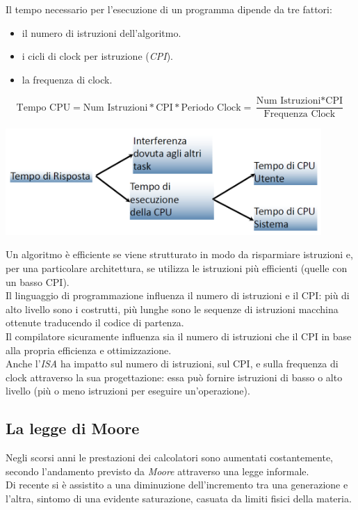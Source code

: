 Il tempo necessario per l'esecuzione di un programma dipende da tre fattori:
\begin{itemize}[nolistsep]
	\item il numero di istruzioni dell'algoritmo.
	\item i cicli di clock per istruzione (\textit{CPI}).
	\item la frequenza di clock.
\end{itemize}
\begin{equation*}
\text{Tempo CPU} = \text{Num Istruzioni} * \text{CPI} * \text{Periodo Clock} = \frac{\text{Num Istruzioni} * \text{CPI}}{\text{Frequenza Clock}}
\end{equation*}
\begin{center}
	\includegraphics[width=0.9\textwidth]{images/tempo_risposta.png}
\end{center}
Un algoritmo è efficiente se viene strutturato in modo da risparmiare istruzioni e, per una particolare architettura, se utilizza le istruzioni più efficienti (quelle con un basso CPI).\\
Il linguaggio di programmazione influenza il numero di istruzioni e il CPI: più di alto livello sono i costrutti, più lunghe sono le sequenze di istruzioni macchina ottenute traducendo il codice di partenza.\\
Il compilatore sicuramente influenza sia il numero di istruzioni che il CPI in base alla propria efficienza e ottimizzazione.\\
Anche l'\textit{ISA} ha impatto sul numero di istruzioni, sul CPI, e sulla frequenza di clock attraverso la sua progettazione: essa può fornire istruzioni di basso o alto livello (più o meno istruzioni per eseguire un'operazione).

\subsection{La legge di Moore}
Negli scorsi anni le prestazioni dei calcolatori sono aumentati costantemente, secondo l'andamento previsto da \textit{Moore} attraverso una legge informale.\\
Di recente si è assistito a una diminuzione dell’incremento tra una generazione e l’altra, sintomo di una evidente saturazione, casuata da limiti fisici della materia.

